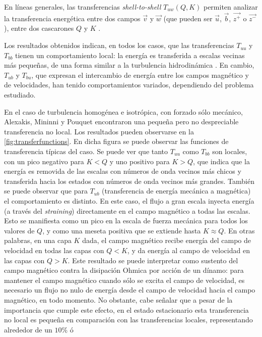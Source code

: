 En líneas generales, las transferencias \textit{shell-to-shell}
$T_{uw}(Q, K)$ permiten analizar la transferencia energética
entre dos campos $\vec{v}$ y $\vec{w}$ (que pueden ser $\vec{u}$,
$\vec{b}$, $\vec{z^+}$ o $\vec{z^-}$), entre dos cascarones $Q$ y $K$
\cite{mininni_scale_2011}.

Los resultados obtenidos indican, en todos los casos, que las
transferencias $T_{uu}$ y $T_{bb}$ tienen un comportamiento local: la
energía es transferida a escalas vecinas más pequeñas, de una forma
similar a la turbulencia hidrodinámica \cite{alexakis_imprint_2005,
  mininni_large_2006}. En cambio, $T_{ub}$ y $T_{bu}$, que expresan el
intercambio de energía entre los campos magnético y de velocidades,
han tenido comportamientos variados, dependiendo del problema
estudiado.

En el caso de turbulencia homogénea e isotrópica, con forzado sólo
mecánico, Alexakis, Mininni y Pouquet \cite{alexakis_imprint_2005}
encontraron una pequeña pero no despreciable transferencia no
local. Los resultados pueden observarse en la
\cref{fig:transferfunctions}. En dicha figura se puede observar las
funciones de transferencia típicas del caso. Se puede ver que tanto
$T_{uu}$ como $T_{bb}$ son locales, con un pico negativo para $K<Q$ y
uno positivo para $K>Q$, que indica que la energía es removida de las
escalas con números de onda vecinos más chicos y transferida hacia los
estados con números de onda vecinos más grandes. También se puede
observar que para $T_{ub}$ (transferencia de energía mecánica a
magnética) el comportamiento es distinto. En este caso, el flujo a
gran escala inyecta energía (a través del \textit{straining})
directamente en el campo magnético a todas las escalas. Esto se
manifiesta como un pico en la escala de fuerza mecánica para todos los
valores de $Q$, y como una meseta positiva que se extiende hasta
$K\approx Q$.  En otras palabras, en una capa $K$ dada, el campo
magnético recibe energía del campo de velocidad en todas las capas con
$Q<K$, y da energía al campo de velocidad en las capas con $Q>K$. Este
resultado se puede interpretar como sustento del campo magnético
contra la disipación Ohmica por acción de un dínamo: para mantener el
campo magnético cuando sólo se excita el campo de velocidad, es
necesario un flujo no nulo de energía desde el campo de velocidad
hacia el campo magnético, en todo momento. No obstante, cabe señalar
que a pesar de la importancia que cumple este efecto, en el estado
estacionario esta transferencia no local es pequeña en comparación con
las transferencias locales, representando alrededor de un $10\%$ ó

